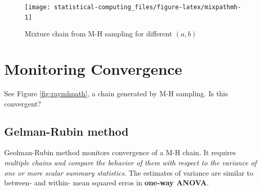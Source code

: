 \documentclass[]{book}
\newenvironment{Shaded}{\begin{snugshade}}{\end{snugshade}}
\newcommand{\DataTypeTok}[1]{\textcolor[rgb]{0.13,0.29,0.53}{#1}}
\newcommand{\DecValTok}[1]{\textcolor[rgb]{0.00,0.00,0.81}{#1}}
\newcommand{\KeywordTok}[1]{\textcolor[rgb]{0.13,0.29,0.53}{\textbf{#1}}}
\newcommand{\NormalTok}[1]{#1}
\newcommand{\OperatorTok}[1]{\textcolor[rgb]{0.81,0.36,0.00}{\textbf{#1}}}
\newcommand{\StringTok}[1]{\textcolor[rgb]{0.31,0.60,0.02}{#1}}
\theoremstyle{definition}
\theoremstyle{definition}
\theoremstyle{definition}
\theoremstyle{remark}
\begin{document}
\begin{Shaded}
\end{Shaded}

\begin{figure}[H]

{\centering \texttt{[image: statistical-computing\_files/figure-latex/mixpathmh-1]} 

}

\caption{Mixture chain from M-H sampling for different $(a, b)$}\label{fig:mixpathmh}
\end{figure}

\hypertarget{monitoring-convergence}{%
\section{Monitoring Convergence}\label{monitoring-convergence}}

See Figure \ref{fig:raymhpath}, a chain generated by M-H sampling. Is this convergent?

\hypertarget{gelman-rubin-method}{%
\subsection{Gelman-Rubin method}\label{gelman-rubin-method}}

Geolman-Rubin method monitors convergence of a M-H chain. It requires \emph{multiple chains and compare the behavior of them with respect to the variance of one or more scalar summary statistics}. The estimates of variance are similar to between- and within- mean squared erros in \textbf{one-way ANOVA}.
\end{document}
